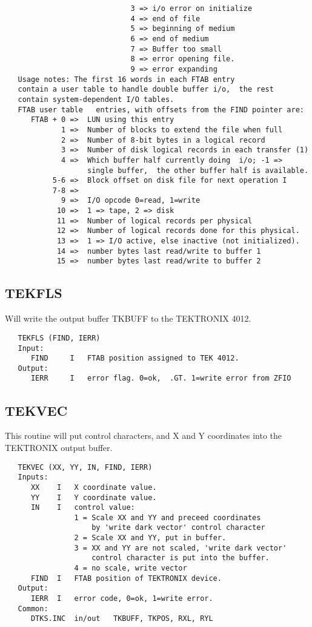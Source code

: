 \begin{verbatim}
                             3 => i/o error on initialize
                             4 => end of file
                             5 => beginning of medium
                             6 => end of medium
                             7 => Buffer too small
                             8 => error opening file.
                             9 => error expanding
   Usage notes: The first 16 words in each FTAB entry
   contain a user table to handle double buffer i/o,  the rest
   contain system-dependent I/O tables.
   FTAB user table   entries, with offsets from the FIND pointer are:
      FTAB + 0 =>  LUN using this entry
             1 =>  Number of blocks to extend the file when full
             2 =>  Number of 8-bit bytes in a logical record
             3 =>  Number of disk logical records in each transfer (1)
             4 =>  Which buffer half currently doing  i/o; -1 =>
                   single buffer,  the other buffer half is available.
           5-6 =>  Block offset on disk file for next operation I
           7-8 =>
             9 =>  I/O opcode 0=read, 1=write
            10 =>  1 => tape, 2 => disk
            11 =>  Number of logical records per physical
            12 =>  Number of logical records done for this physical.
            13 =>  1 => I/O active, else inactive (not initialized).
            14 =>  number bytes last read/write to buffer 1
            15 =>  number bytes last read/write to buffer 2
\end{verbatim}

\subsection{TEKFLS}
Will write the output buffer TKBUFF to the TEKTRONIX 4012.
\begin{verbatim}
   TEKFLS (FIND, IERR)
   Input:
      FIND     I   FTAB position assigned to TEK 4012.
   Output:
      IERR     I   error flag. 0=ok,  .GT. 1=write error from ZFIO
\end{verbatim}

\subsection{TEKVEC}
This routine will put control characters, and X and Y coordinates
into the TEKTRONIX output buffer.
\begin{verbatim}
   TEKVEC (XX, YY, IN, FIND, IERR)
   Inputs:
      XX    I   X coordinate value.
      YY    I   Y coordinate value.
      IN    I   control value:
                1 = Scale XX and YY and preceed coordinates
                    by 'write dark vector' control character
                2 = Scale XX and YY, put in buffer.
                3 = XX and YY are not scaled, 'write dark vector'
                    control character is put into the buffer.
                4 = no scale, write vector
      FIND  I   FTAB position of TEKTRONIX device.
   Output:
      IERR  I   error code, 0=ok, 1=write error.
   Common:
      DTKS.INC  in/out   TKBUFF, TKPOS, RXL, RYL
\end{verbatim}

